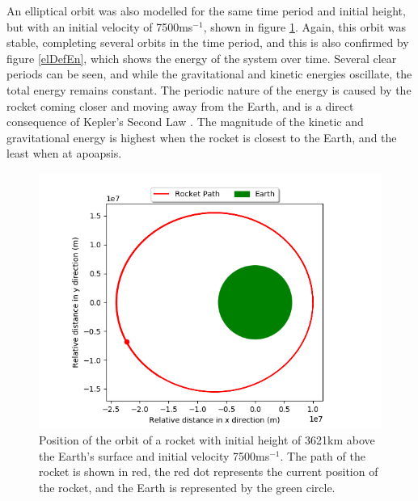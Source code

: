 \documentclass[twocolumn,prl,nobalancelastpage,aps,10pt]{revtex4-1}
\begin{document}
An elliptical orbit was also modelled for the same time period and initial height, but with an initial velocity of 7500ms$^{-1}$, shown in figure \ref{elDefFig}. Again, this orbit was stable, completing several orbits in the time period, and this is also confirmed by figure \ref{elDefEn}, which shows the energy of the system over time. Several clear periods can be seen, and while the gravitational and kinetic energies oscillate, the total energy remains constant. The periodic nature of the energy is caused by the rocket coming closer and moving away from the Earth, and is a direct consequence of Kepler's Second Law \cite{Kepler1992}. The magnitude of the kinetic and gravitational energy is highest when the rocket is closest to the Earth, and the least when at apoapsis.

\begin{figure}[ht]
	\includegraphics*[width=0.96\linewidth,clip]{ellipticalDefault}
	\caption{Position of the orbit of a rocket with initial height of 3621km above the Earth's surface and initial velocity 7500ms$^{-1}$. The path of the rocket is shown in red, the red dot represents the current position of the rocket, and the Earth is represented by the green circle.} \label{elDefFig}
\end{figure}
\end{document}
